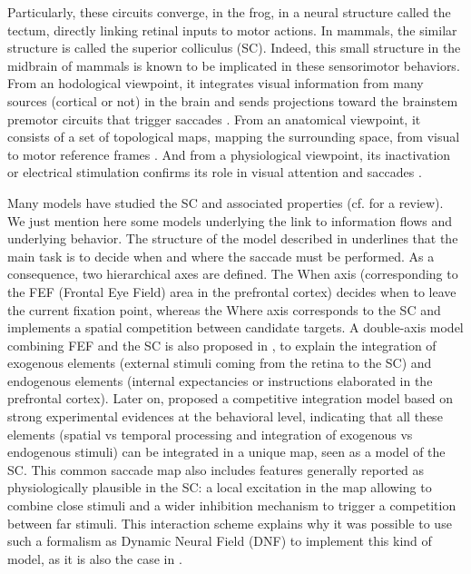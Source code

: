 Particularly, these circuits converge, in the frog, in a neural
structure called the tectum, directly linking retinal inputs to motor
actions. In mammals, the similar structure is called the superior
colliculus (SC).  Indeed, this small structure in the midbrain of
mammals is known to be implicated in these sensorimotor
behaviors. From an hodological viewpoint, it integrates visual
information from many sources (cortical or not) in the brain and sends
projections toward the brainstem premotor circuits that trigger
saccades \cite{Isa:2002}. From an anatomical viewpoint, it consists of
a set of topological maps, mapping the surrounding space, from visual
to motor reference frames \cite{Girard:2005}. And from a physiological
viewpoint, its inactivation or electrical stimulation confirms its
role in visual attention and saccades \cite{Muller:2005}.

Many models have studied the SC and associated properties
(cf. \cite{Girard:2005} for a review). We just mention here some models
underlying the link to information flows and underlying behavior. The structure
of the model described in \cite{Findlay:1999} underlines that the main task is
to decide when and where the saccade must be performed. As a consequence, two
hierarchical axes are defined. The When axis (corresponding to the FEF (Frontal
Eye Field) area in the prefrontal cortex) decides when to leave the current
fixation point, whereas the Where axis corresponds to the SC and implements a
spatial competition between candidate targets. A double-axis model combining
FEF and the SC is also proposed in \cite{Kramer:1999}, to explain the
integration of exogenous elements (external stimuli coming from the retina to
the SC) and endogenous elements (internal expectancies or instructions
elaborated in the prefrontal cortex). Later on, \cite{Godijn:2002} proposed a
competitive integration model based on strong experimental evidences at the
behavioral level, indicating that all these elements (spatial vs temporal
processing and integration of exogenous vs endogenous stimuli) can be
integrated in a unique map, seen as a model of the SC. This common saccade map
also includes features generally reported as physiologically plausible in the
SC: a local excitation in the map allowing to combine close stimuli and a wider inhibition mechanism to trigger a competition between far stimuli. This
interaction scheme explains why it was possible to use such a formalism as
Dynamic Neural Field (DNF) \cite{Amari:1977} to implement this kind of model, as it is also the case in \cite{Trappenberg:2001,Schneider:2002}.

